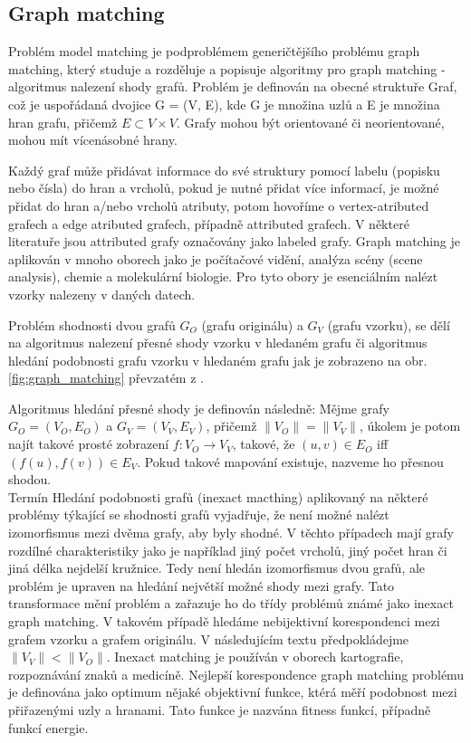 \documentclass[11pt,twoside,a4paper]{book}
\begin{document}
\subsection{Graph matching}
 Problém model matching je podproblémem generičtějšího problému graph matching, 
 který studuje \cite{bengoetxeaPHD02} a rozděluje a popisuje algoritmy pro
 graph matching - algoritmus nalezení shody grafů. Problém je definován na
 obecné struktuře Graf, což je uspořádaná dvojice G = (V, E), kde G je množina
 uzlů a E je množina hran grafu, přičemž $E \subset V \times V$. Grafy mohou
 být orientované či neorientované, mohou mít vícenásobné hrany.
 
 Každý graf může přidávat informace do své struktury pomocí labelu (popisku
 nebo čísla) do hran a vrcholů, pokud je nutné přidat více informací, je možné
 přidat do hran a/nebo vrcholů atributy, potom hovoříme o vertex-atributed
 grafech a edge atributed grafech, případně attributed grafech. V některé
 literatuře jsou attributed grafy označovány jako labeled grafy. Graph
 matching je aplikován v mnoho oborech jako je počítačové vidění, analýza
 scény (scene analysis), chemie a molekulární biologie. Pro tyto obory je
 esenciálním nalézt vzorky nalezeny v daných datech. 
  
 Problém shodnosti dvou grafů $G_O$ (grafu originálu) a $G_V$ (grafu
 vzorku), se dělí na algoritmus nalezení přesné shody vzorku v hledaném grafu
 či algoritmus hledání podobnosti grafu vzorku v hledaném grafu jak je zobrazeno
 na obr. \ref{fig:graph_matching} převzatém z \cite{bengoetxeaPHD02}.
 
 Algoritmus hledání přesné shody je definován následně: Mějme grafy $G_O = (V_O
 , E_O)$ a $G_V = (V_V, E_V)$, přičemž $\| V_O\| = \| V_V\|$, úkolem je potom
 najít takové prosté zobrazení  $f: V_O \rightarrow V_V$, takové, že $(u, v) \in
 E_O$ iff $(f(u), f(v)) \in E_V$. Pokud takové mapování existuje, nazveme ho
 přesnou shodou. \\
 
 Termín Hledání podobnosti grafů (inexact macthing) aplikovaný na některé
 problémy týkající se shodnosti grafů vyjadřuje, že není možné nalézt
 izomorfismus mezi dvěma grafy, aby byly shodné. V těchto případech mají grafy
 rozdílné charakteristiky jako je například jiný počet vrcholů, jiný počet hran
 či jiná délka nejdelší kružnice.
 Tedy není hledán izomorfismus dvou grafů, ale problém je upraven na hledání
 největší možné shody mezi grafy.
 Tato transformace mění problém a zařazuje ho do třídy problémů známé jako
 inexact graph matching.
 V takovém případě hledáme nebijektivní korespondenci mezi grafem vzorku a grafem
 originálu. V následujícím textu předpokládejme $\|V_V\| < \|V_O\|$. Inexact
 matching je používán v oborech kartografie, rozpoznávání znaků a medicíně.
 Nejlepší korespondence graph matching problému je definována jako optimum
 nějaké objektivní funkce, ktérá měří podobnost mezi přiřazenými uzly a
 hranami. Tato funkce je nazvána fitness funkcí, případně funkcí energie.
\end{document}
